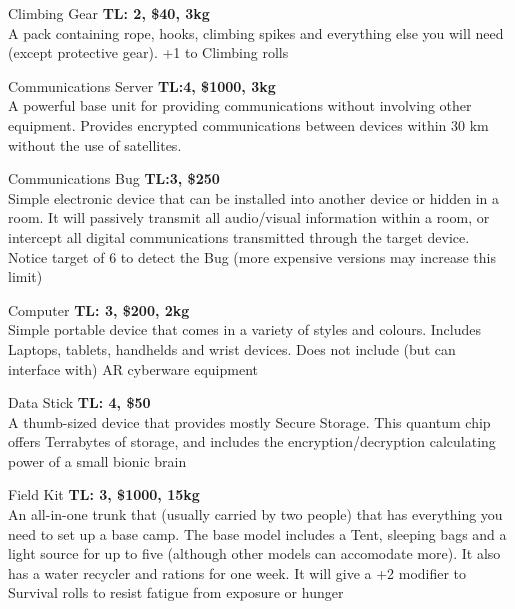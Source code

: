 \begin{genericsection}{Climbing Gear}
\textbf{TL: 2, \$40, 3kg}\\
A pack containing rope, hooks, climbing spikes and everything else you will need (except protective gear). +1 to Climbing rolls
\end{genericsection}

\begin{genericsection}{Communications Server}
\textbf{TL:4, \$1000, 3kg}\\
A powerful base unit for providing communications without involving other equipment. Provides encrypted communications between devices within 30 km without the use of satellites.
\end{genericsection}

\begin{genericsection}{Communications Bug}
\textbf{TL:3, \$250}\\
Simple electronic device that can be installed into another device or hidden in a room. It will passively transmit all audio/visual information within a room, or intercept all digital communications transmitted through the target device. Notice target of 6 to detect the Bug (more expensive versions may increase this limit)
\end{genericsection}

\begin{genericsection}{Computer}
\textbf{TL: 3, \$200, 2kg}\\
Simple portable device that comes in a variety of styles and colours. Includes Laptops, tablets, handhelds and wrist devices. Does not include (but can interface with) AR cyberware equipment
\end{genericsection}

\begin{genericsection}{Data Stick}
\textbf{TL: 4, \$50}\\
A thumb-sized device that provides mostly Secure Storage. This quantum chip offers Terrabytes of storage, and includes the encryption/decryption calculating power of a small bionic brain
\end{genericsection}

\begin{genericsection}{Field Kit}
\textbf{TL: 3, \$1000, 15kg}\\
An all-in-one trunk that (usually carried by two people) that has everything you need to set up a base camp. The base model includes a Tent, sleeping bags and a light source for up to five (although other models can accomodate more). It also has a water recycler and rations for one week. It will give a +2 modifier to Survival rolls to resist fatigue from exposure or hunger
\end{genericsection}

